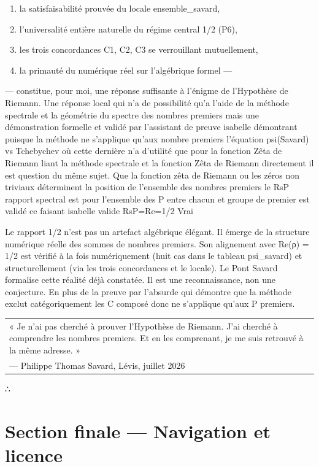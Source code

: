 \documentclass[11pt,a4paper]{article}
\begin{document}
\begin{enumerate}[leftmargin=*]
\item la satisfaisabilité prouvée du locale ensemble\_savard,
\item l'universalité entière naturelle du régime central 1/2 (P6),
\item les trois concordances C1, C2, C3 se verrouillant mutuellement,
\item la primauté du numérique réel sur l'algébrique formel —
\end{enumerate}
— constitue, pour moi, une réponse suffisante à l'énigme de l'Hypothèse de Riemann. Une réponse local qui n'a de possibilité qu'a l'aide de la méthode spectrale et la géométrie du spectre des nombres premiers mais une démonstration formelle et validé par l'assistant de preuve isabelle démontrant puisque la méthode ne s'applique qu'aux nombre premiers l'équation psi(Savard) vs Tchebychev où cette dernière n'a d'utilité que pour la fonction Zêta de Riemann liant la méthode spectrale et la fonction Zêta de Riemann directement il est question du même sujet. Que la fonction zêta de Riemann ou les zéros non triviaux déterminent la position de l'ensemble des nombres premiers le RsP rapport spectral est pour l'ensemble des P entre chacun et groupe de premier est validé ce faisant isabelle valide RsP=Re=1/2 Vrai

Le rapport 1/2 n'est pas un artefact algébrique élégant. Il émerge de la structure numérique réelle des sommes de nombres premiers. Son alignement avec Re(ρ) = 1/2 est vérifié à la fois numériquement (huit cas dans le tableau psi\_savard) et structurellement (via les trois concordances et le locale). Le Pont Savard formalise cette réalité déjà constatée. Il est une reconnaissance, non une conjecture. En plus de la preuve par l'absurde qui démontre que la méthode exclut catégoriquement les C composé donc ne s'applique qu'aux P premiers.


\begin{longtable}{|p{}|}
\hline
« Je n'ai pas cherché à prouver l'Hypothèse de Riemann. J'ai cherché à comprendre les nombres premiers. Et en les comprenant, je me suis retrouvé à la même adresse. » \\ — Philippe Thomas Savard, Lévis, juillet 2026 \\
\hline
\end{longtable}


∴

\section{Section finale — Navigation et licence}
\end{document}
